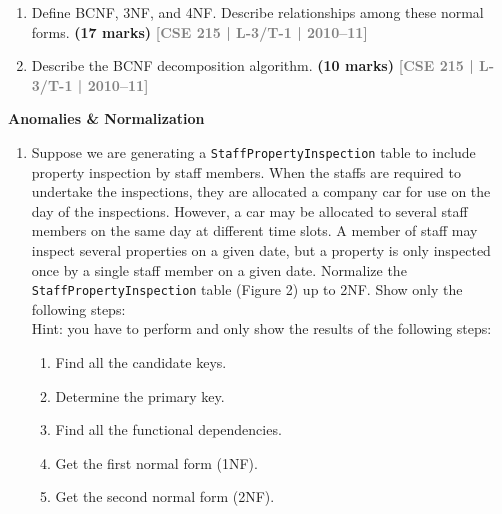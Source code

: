 \documentclass[12pt,a3paper]{article}
\newcommand{\yr}[1]{\hfill\textcolor{gray}{\small\textbf{[#1]}}}
\newcommand{\mk}[1]{\textcolor{orange!70!black}{\small\textbf{(#1 marks)}}}
\newcommand{\subtopic}[2]{%
  \vspace{10pt}
  \noindent\begin{tcolorbox}[colback=#1!8,colframe=#1,boxrule=0.6pt,arc=4pt,
    left=6pt,right=6pt,top=4pt,bottom=4pt]
    \small\bfseries\textcolor{#1}{#2}
  \end{tcolorbox}
  \vspace{2pt}
}
\begin{document}
\begin{enumerate}
\item Define BCNF, 3NF, and 4NF. Describe relationships among these normal forms.
\mk{17} \yr{CSE 215 | L-3/T-1 | 2010--11}

\item Describe the BCNF decomposition algorithm.
\mk{10} \yr{CSE 215 | L-3/T-1 | 2010--11}

\end{enumerate}

\subtopic{cC}{Anomalies \& Normalization}
\label{sub:s4-anomaly}

\begin{enumerate}

\item Suppose we are generating a \texttt{StaffPropertyInspection} table to include property inspection
by staff members. When the staffs are required to undertake the inspections, they are
allocated a company car for use on the day of the inspections. However, a car may be allocated
to several staff members on the same day at different time slots. A member of staff
may inspect several properties on a given date, but a property is only inspected once by a
single staff member on a given date.
Normalize the \texttt{StaffPropertyInspection} table (Figure 2) up to 2NF. Show only the following steps:\\
Hint: you have to perform and only show the results of the following steps:
\begin{enumerate}
  \item Find all the candidate keys.
  \item Determine the primary key.
  \item Find all the functional dependencies.
  \item Get the first normal form (1NF).
  \item Get the second normal form (2NF).
\end{enumerate}


\end{enumerate}
\end{document}
